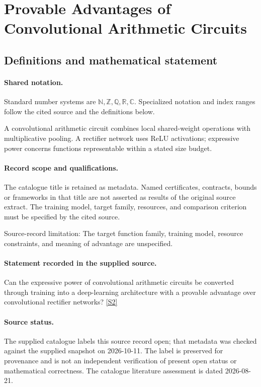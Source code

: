 \documentclass[11pt]{article}
\newcommand{\sref}[2]{\hyperlink{source:#1:#2}{[S#2]}}
\begin{document}
\section{Provable Advantages of Convolutional Arithmetic Circuits}\label{statement}

\subsection{Definitions and mathematical statement}

\paragraph{Shared notation.}Standard number systems are $\mathbb N,\mathbb Z,\mathbb Q,\mathbb R,\mathbb C$. Specialized notation and index ranges follow the cited source and the definitions below.


A convolutional arithmetic circuit combines local shared-weight operations with multiplicative pooling. A rectifier network uses ReLU activations; expressive power concerns functions representable within a stated size budget.
\paragraph{Record scope and qualifications.}
The catalogue title is retained as metadata. Named certificates, contracts, bounds or frameworks in that title are not asserted as results of the original source extract.
The training model, target family, resources, and comparison criterion must be specified by the cited source.

Source-record limitation: The target function family, training model, resource constraints, and meaning of advantage are unspecified.
\paragraph{Statement recorded in the supplied source.}
Can the expressive power of convolutional arithmetic circuits be converted through training into a deep-learning architecture with a provable advantage over convolutional rectifier networks? \sref{statement}{2}
\paragraph{Source status.}
The supplied catalogue labels this source record open; that metadata was checked against the supplied snapshot on 2026-10-11. The label is preserved for provenance and is not an independent verification of present open status or mathematical correctness. The catalogue literature assessment is dated 2026-08-21.
\end{document}
